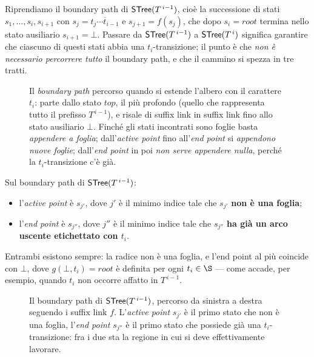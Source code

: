 Riprendiamo il boundary path di $\textsf{STree}{}(T^{\,i-1})$, cioè la successione di stati
$s_1,\dots,s_i,s_{i+1}$ con $s_j = \overline{t_j\cdots t_{i-1}}$ e $s_{j+1} = f(s_j)$, che
dopo $s_i = \mathit{root}$ termina nello stato ausiliario $s_{i+1} = \bot$. Passare da
$\textsf{STree}{}(T^{\,i-1})$ a $\textsf{STree}{}(T^{\,i})$ significa garantire che ciascuno di questi stati
abbia una $t_i$-transizione; il punto è che \emph{non è necessario percorrere tutto} il
boundary path, e che il cammino si spezza in tre tratti.

\begin{figure}[H]
\centering

\caption{Il \emph{boundary path} percorso quando si estende l'albero con il carattere $t_i$:
parte dallo stato $\mathit{top}$, il più profondo (quello che rappresenta tutto il prefisso
$T^{\,i-1}$), e risale di suffix link in suffix link fino allo stato ausiliario $\bot$.
Finché gli stati incontrati sono foglie basta \emph{appendere a foglia}; dall'\emph{active
point} fino all'\emph{end point} si \emph{appendono nuove foglie}; dall'\emph{end point} in
poi \emph{non serve appendere nulla}, perché la $t_i$-transizione c'è già.}
\label{fig:boundary-path-tripartizione}
\end{figure}

\begin{definizione}\label{def:active-end-point}
Sul boundary path di $\textsf{STree}{}(T^{\,i-1})$:
\begin{itemize}
  \item l'\emph{active point} è $s_{j'}$, dove $j'$ è il minimo indice tale che $s_{j'}$
        \textbf{non è una foglia};
  \item l'\emph{end point} è $s_{j''}$, dove $j''$ è il minimo indice tale che $s_{j''}$
        \textbf{ha già un arco uscente etichettato con $t_i$}.
\end{itemize}
Entrambi esistono sempre: la radice non è una foglia, e l'end point al più coincide con
$\bot$, dove $g(\bot,t_i) = \mathit{root}$ è definita per ogni $t_i \in \S$ --- come accade,
per esempio, quando $t_i$ non occorre affatto in $T^{\,i-1}$.
\end{definizione}

\begin{figure}[H]
\centering

\caption{Il boundary path di $\textsf{STree}{}(T^{\,i-1})$, percorso da sinistra a destra seguendo i
suffix link $f$. L'\emph{active point} $s_{j'}$ è il primo stato che non è una foglia,
l'\emph{end point} $s_{j''}$ è il primo stato che possiede già una $t_i$-transizione: fra i
due sta la regione in cui si deve effettivamente lavorare.}
\label{fig:active-end-point}
\end{figure}

